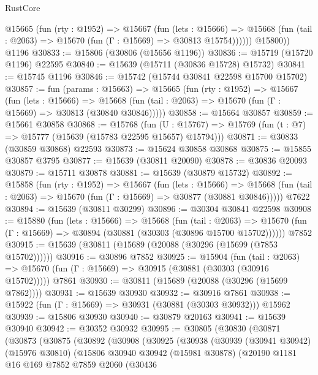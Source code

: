\begin{lexlean}{RustCore}
\begin{coremodule}
          @15665
            (fun (rty : @1952) =>
            @15667
              (fun (lets : @15666) =>
              @15668 (fun (tail : @2063) => @15670 (fun (Γ : @15669) => @30813 @15754))))))
        @15800))
    @1196
@30833 := @15806 (@30806 (@15656 @1196))
@30836 := @15719 (@15720 @1196) @22595
@30840 := @15639 (@15711 (@30836 @15728) @15732)
@30841 := @15745 @1196
@30846 := @15742 (@15744 @30841 @22598 @15700 @15702)
@30857 := fun (params : @15663) =>
  @15665
    (fun (rty : @1952) =>
    @15667
      (fun (lets : @15666) =>
      @15668 (fun (tail : @2063) => @15670 (fun (Γ : @15669) => @30813 (@30840 @30846)))))
@30858 := @15664 @30857
@30859 := @15661 @30858
@30868 := @15768
    (fun (U : @15767) => @15769 (fun (t : @7) => @15777 (@15639 (@15783 @22595 @15657) @15794)))
@30871 := @30833 (@30859 @30868) @22593
@30873 := @15624 @30858 @30868
@30875 := @15855 @30857 @3795
@30877 := @15639 (@30811 @20090)
@30878 := @30836 @20093
@30879 := @15711 @30878
@30881 := @15639 (@30879 @15732)
@30892 := @15858
    (fun (rty : @1952) =>
    @15667
      (fun (lets : @15666) =>
      @15668 (fun (tail : @2063) => @15670 (fun (Γ : @15669) => @30877 (@30881 @30846)))))
    @7622
@30894 := @15639 (@30811 @30299)
@30896 := @30304 @30841 @22598
@30908 := @15880
    (fun (lets : @15666) =>
    @15668
      (fun (tail : @2063) =>
      @15670 (fun (Γ : @15669) => @30894 (@30881 (@30303 (@30896 @15700 @15702))))))
    @7852
@30915 := @15639 (@30811 (@15689 (@20088 (@30296 (@15699 (@7853 @15702))))))
@30916 := @30896 @7852
@30925 := @15904
    (fun (tail : @2063) => @15670 (fun (Γ : @15669) => @30915 (@30881 (@30303 (@30916 @15702)))))
    @7861
@30930 := @30811 (@15689 (@20088 (@30296 (@15699 @7862))))
@30931 := @15639 @30930
@30932 := @30916 @7861
@30938 := @15922 (fun (Γ : @15669) => @30931 (@30881 (@30303 @30932))) @15962
@30939 := @15806 @30930
@30940 := @30879 @20163
@30941 := @15639 @30940
@30942 := @30352 @30932
@30995 := @30805
    (@30830
      (@30871
        (@30873
          (@30875
            (@30892
              (@30908
                (@30925
                  (@30938
                    (@30939
                      (@30941 @30942)
                      (@15976 @30810)
                      (@15806
                        @30940
                        @30942
                        (@15981 @30878)
                        (@20190
                          @1181
                          @16
                          @169
                          @7852
                          @7859
                          @2060
                          (@30436

\end{coremodule}
\end{lexlean}
